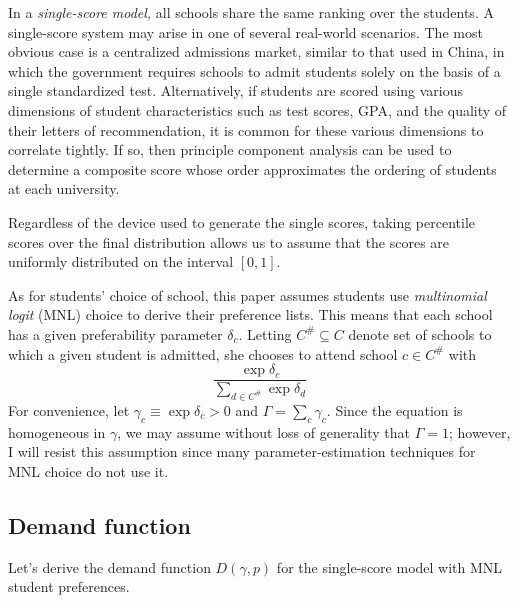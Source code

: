 \documentclass[12pt]{article}
\theoremstyle{definition}
\begin{document}
In a \emph{single-score model,} all schools share the same ranking over the students. A single-score system may arise in one of several real-world scenarios. The most obvious case is a centralized admissions market, similar to that used in China, in which the government requires schools to admit students solely on the basis of a single standardized test. Alternatively, if students are scored using various dimensions of student characteristics such as test scores, GPA, and the quality of their letters of recommendation, it is common for these various dimensions to correlate tightly. If so, then principle component analysis can be used to determine a composite score whose order approximates the ordering of students at each university.


Regardless of the device used to generate the single scores, taking percentile scores over the final distribution allows us to assume that the scores are uniformly distributed on the interval $[0,1]$. 

As for students' choice of school, this paper assumes students use \emph{multinomial logit} (MNL) choice to derive their preference lists. This means that each school has a given preferability parameter $\delta_c$. Letting $C^\# \subseteq C$ denote set of schools to which a given student is admitted, she chooses to attend school $c \in C^\#$ with
\[\frac{\exp \delta_c}{\sum_{d \in C^\#} \exp \delta_d}\]
For convenience, let $\gamma_c \equiv \exp \delta_c > 0$ and $\Gamma = \sum_c \gamma_c$. Since the equation is homogeneous in $\gamma$, we may assume without loss of generality that $\Gamma = 1$; however, I will resist this assumption since many parameter-estimation techniques for MNL choice do not use it. 

\subsection{Demand function}
Let's derive the demand function $D(\gamma, p)$ for the single-score model with MNL student preferences.
\end{document}

